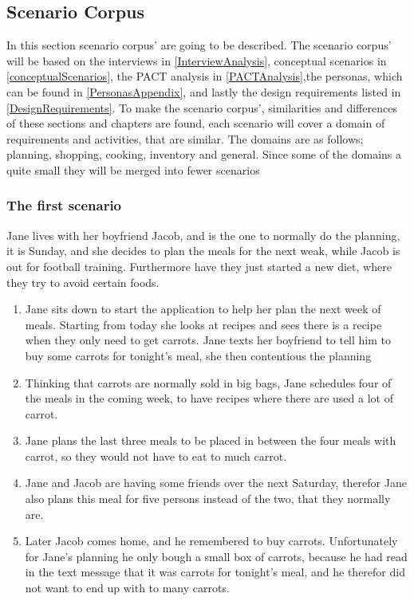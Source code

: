 \subsection{Scenario Corpus} \label{ScenarioCorpus}

In this section scenario corpus' are going to be described. The scenario corpus' will be based on the interviews in \cref{InterviewAnalysis}, conceptual scenarios in \cref{conceptualScenarios}, the PACT analysis in \cref{PACTAnalysis},the personas, which can be found in \cref{PersonasAppendix}, and lastly the design requirements listed in \cref{DesignRequirements}. To make the scenario corpus', similarities and differences of these sections and chapters are found, each scenario will cover a domain of requirements and activities, that are similar. The domains are as follows; planning, shopping, cooking, inventory and general. Since some of the domains a quite small they will be merged into fewer scenarios

\subsubsection{The first scenario}
Jane lives with her boyfriend Jacob, and is the one to normally do the planning, it is Sunday, and she decides to plan the meals for the next weak, while Jacob is out for football training. Furthermore have they just started a new diet, where they try to avoid certain foods.
\begin{enumerate}
  \item Jane sits down to start the application to help her plan the next week of meals. Starting from today she looks at recipes and sees there is a recipe when they only need to get carrots. Jane texts her boyfriend to tell him to buy some carrots for tonight's meal, she then contentious the planning
  \item Thinking that carrots are normally sold in big bags, Jane schedules four of the meals in the coming week, to have recipes where there are used a lot of carrot.
  \item Jane plans the last three meals to be placed in between the four meals with carrot, so they would not have to eat to much carrot.
  \item Jane and Jacob are having some friends over the next Saturday, therefor Jane also plans this meal for five persons instead of the two, that they normally are.
  \item Later Jacob comes home, and he remembered to buy carrots. Unfortunately for Jane's planning he only bough a small box of carrots, because he had read in the text message that it was carrots for tonight's meal, and he therefor did not want to end up with to many carrots.
\end{enumerate}

